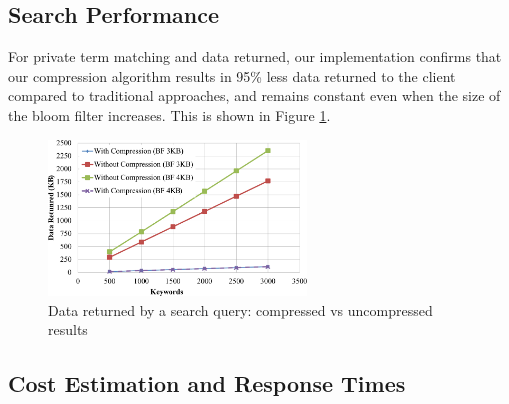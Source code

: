 \subsection{Search Performance}

For private term matching and data returned, our implementation confirms
that our compression algorithm results in 95\% less data returned to the client
compared to traditional approaches, and remains constant even when the size
of the bloom filter increases. This is shown in Figure \ref{fig:compress}.

\begin{figure}[h!]
  \centering
  \includegraphics[width=2.7in]{figures/comp_compare.png}
  \vspace{-10px}
  \caption{Data returned by a search query: compressed vs uncompressed results}
  \label{fig:compress}
\end{figure}


%

\subsection{Cost Estimation and Response Times}

